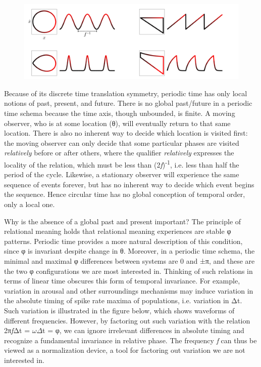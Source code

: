  
\begin{figure}
\includegraphics[width=\textwidth]{figures/Tilsen-img47.png}
\caption{\missingcaption}
\label{fig:}
\end{figure}
 

  Because of its discrete time translation symmetry, periodic time has only local notions of past, present, and future. There is no global past/future in a periodic time schema because the time axis, though unbounded, is finite. A moving observer, who is at some location (θ), will eventually return to that same location. There is also no inherent way to decide which location is visited first: the moving observer can only decide that some particular phases are visited \textit{relatively} before or after others, where the qualifier \textit{relatively} expresses the locality of the relation, which must be less than (2\textit{f})\textsuperscript{{}-1}, i.e. less than half the period of the cycle. Likewise, a stationary observer will experience the same sequence of events forever, but has no inherent way to decide which event begins the sequence. Hence circular time has no global conception of temporal order, only a local one. 

  Why is the absence of a global past and present important? The principle of relational meaning holds that relational meaning experiences are stable φ patterns. Periodic time provides a more natural description of this condition, since φ is invariant despite change in θ. Moreover, in a periodic time schema, the minimal and maximal φ differences between systems are 0 and ±π, and these are the two φ configurations we are most interested in. Thinking of such relations in terms of linear time obscures this form of temporal invariance. For example, variation in arousal and other surroundings mechanisms may induce variation in the absolute timing of spike rate maxima of populations, i.e. variation in Δt. Such variation is illustrated in the figure below, which shows waveforms of different frequencies. However, by factoring out such variation with the relation 2π\textit{f}Δt = $\omega \Delta $t = φ, we can ignore irrelevant differences in absolute timing and recognize a fundamental invariance in relative phase. The frequency \textit{f} can thus be viewed as a normalization device, a tool for factoring out variation we are not interested in.

